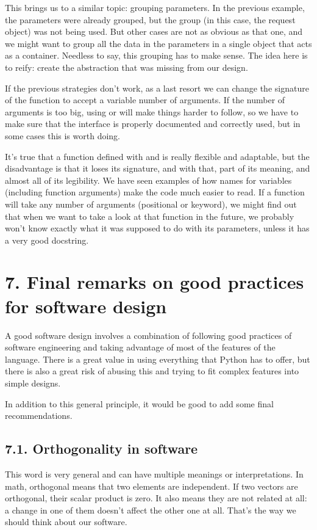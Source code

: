\documentclass[a4paper,10pt,english]{sphinxmanual}
\begin{document}
This brings us to a similar topic: grouping parameters. In the previous example, the parameters were already
grouped, but the group (in this case, the request object) was not being used. But other cases are not as
obvious as that one, and we might want to group all the data in the parameters in a single object that acts
as a container. Needless to say, this grouping has to make sense. The idea here is to reify: create the
abstraction that was missing from our design.

If the previous strategies don’t work, as a last resort we can change the signature of the function to accept
a variable number of arguments. If the number of arguments is too big, using  or  will
make things harder to follow, so we have to make sure that the interface is properly documented and correctly
used, but in some cases this is worth doing.

It’s true that a function defined with  and  is really flexible and adaptable, but the
disadvantage is that it loses its signature, and with that, part of its meaning, and almost all of its
legibility. We have seen examples of how names for variables (including function arguments) make the code much
easier to read. If a function will take any number of arguments (positional or keyword), we might find out
that when we want to take a look at that function in the future, we probably won’t know exactly what it was
supposed to do with its parameters, unless it has a very good docstring.


\section{7. Final remarks on good practices for software design}
\label{\detokenize{chapters/3_general_traits/index:final-remarks-on-good-practices-for-software-design}}
A good software design involves a combination of following good practices of software engineering and taking
advantage of most of the features of the language. There is a great value in using everything that Python has
to offer, but there is also a great risk of abusing this and trying to fit complex features into simple
designs.

In addition to this general principle, it would be good to add some final recommendations.


\subsection{7.1. Orthogonality in software}
\label{\detokenize{chapters/3_general_traits/index:orthogonality-in-software}}
This word is very general and can have multiple meanings or interpretations. In math, orthogonal means that
two elements are independent. If two vectors are orthogonal, their scalar product is zero. It also means they
are not related at all: a change in one of them doesn’t affect the other one at all. That’s the way we should
think about our software.
\end{document}
